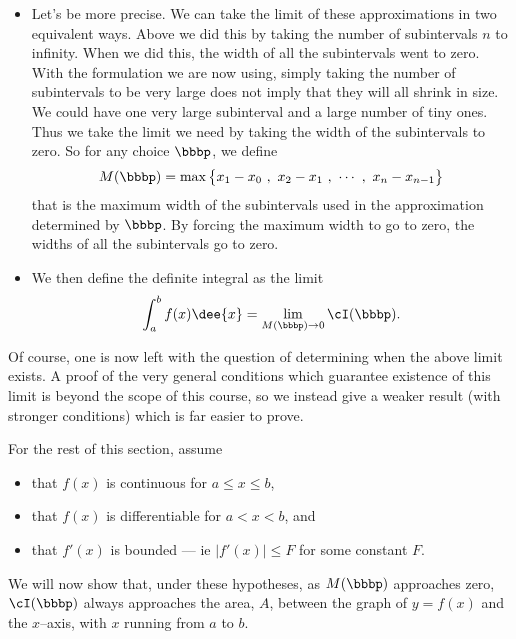 \begin{itemize}
\item Let's be more precise. We can take the limit of these approximations in
two equivalent ways. Above we did this by taking the number of subintervals $n$
to infinity. When we did this, the width of all the subintervals went to zero.
With the formulation we are now using, simply taking the number of subintervals
to be very large does not imply that they will all shrink in size. We could
have
one very large subinterval and a large number of tiny ones. Thus we take the
limit we need by taking the width of the subintervals to zero. So for any
choice
$\bbbp$, we define
\begin{align*}
M(\bbbp)=\max\big\{ x_1-x_0\ ,\  x_2-x_1\ ,\  \cdots\ ,\  x_n-x_{n-1}\big\}
\end{align*}
that is the maximum width of the subintervals used in the approximation
determined by
$\bbbp$. By forcing the maximum width to go to zero, the widths of all the
subintervals
go to zero.
\item We then define the definite integral as the limit
\begin{align*}
\int_a^b f(x)\dee{x}=\lim_{M(\bbbp)\rightarrow 0}\cI(\bbbp).
\end{align*}
\end{itemize}
Of course, one is now left with the question of determining when the above
limit
exists.
A proof of the very general conditions which guarantee existence of this limit
is beyond
the scope of this course, so we instead give a weaker result (with stronger
conditions)
which is far easier to prove.


For the rest of this section, assume
\begin{itemize}
 \item that $f(x)$ is continuous for $a\le x\le b$,
 \item that $f(x)$ is differentiable for $a<x<b$, and
 \item that $f'(x)$ is bounded --- ie $|f'(x)|\leq F$ for some constant $F$.
\end{itemize}
We will now show that, under these hypotheses, as $M(\bbbp)$ approaches zero,
$\cI(\bbbp)$
always approaches the area, $A$, between the graph of $y=f(x)$ and the
$x$--axis, with $x$
running from $a$ to $b$.

